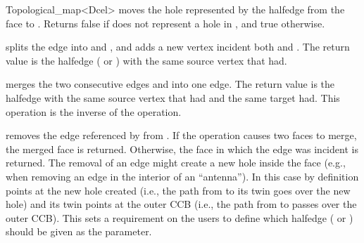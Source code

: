 \begin{ccRefClass}{Topological_map<Dcel>}
     {moves the hole represented by the halfedge  from
        the face  to . Returns false if
         does not represent a hole in ,
        and true otherwise.}


    {splits the edge  into  and   , and
     adds a new vertex incident both  and . 
     The return value
     is the halfedge ( or ) with the same source vertex 
     that  had.
     }

  {merges the two consecutive edges  and  into one 
     edge. The return value is the halfedge with the same source vertex
     that  had and the same target  had.
     This operation is the inverse of the 
     operation.
     }
  
  {removes the edge referenced by  from \ccVar . 
   If the operation causes two faces to merge, the merged face is returned.
   Otherwise, the face in which the edge was incident is returned.
   The removal of an edge might create a new hole inside the face (e.g.,
   when removing an edge in the interior of an ``antenna''). In this
   case by definition  points at the new hole created (i.e., the path
   from  to its twin goes over the new hole) and its twin points
   at the outer CCB (i.e., the path from  to 
   passes over the outer CCB). This sets a requirement on the users to
   define which halfedge ( or ) should be
   given as the parameter.} 

\end{ccRefClass}

\ccRefPageEnd
